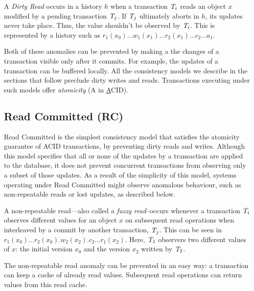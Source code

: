 \begin{definition}
A \emph{Dirty Read} occurs in a history $h$ when a transaction $\mathit{T}_i$ reads an object $x$ modified by a pending transaction $\mathit{T}_j$. If $\mathit{T}_j$ ultimately aborts in $h$, its updates never take place. Thus, the value shouldn't be observed by $\mathit{T}_i$. This is represented by a history such as $r_1(x_0)\ldots w_1(x_1)\ldots r_2(x_1)\ldots c_2\ldots a_1$.
\end{definition}

Both of these anomalies can be prevented by making a the changes of a transaction visible only after it commits. For example, the updates of a transaction can be buffered locally. All the consistency models we describe in the sections that follow preclude dirty writes and reads. Transactions executing under such models offer \emph{atomicity} (A in \underline{A}CID).

\subsection{Read Committed (RC)}

Read Committed is the simplest consistency model that satisfies the atomicity guarantee of ACID transactions, by preventing dirty reads and writes. Although this model specifies that all or none of the updates by a transaction are applied to the database, it does not prevent concurrent transactions from observing only a subset of those updates. As a result of the simplicity of this model, systems operating under Read Committed might observe anomalous behaviour, such as non-repeatable reads or lost updates, as described below.

\begin{definition}
A non-repeatable read---also called a \emph{fuzzy read}--occurs whenever a transaction $\mathit{T}_i$ observes different values for an object $x$ on subsequent read operations when interleaved by a commit by another transaction, $\mathit{T}_j$. This can be seen in $r_1(x_0)\ldots r_2(x_0).w_2(x_2).c_2 \ldots r_1(x_2)$. Here, $\mathit{T}_1$ observers two different values of $x$: the initial version $x_0$ and the version $x_2$ written by $\mathit{T}_2$.
\end{definition}

The non-repeatable read anomaly can be prevented in an easy way: a transaction can keep a cache of already read values. Subsequent read operations can return values from this read cache.

